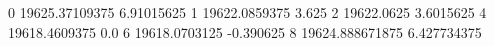 0 19625.37109375 6.91015625
1 19622.0859375 3.625
2 19622.0625 3.6015625
4 19618.4609375 0.0
6 19618.0703125 -0.390625
8 19624.888671875 6.427734375

